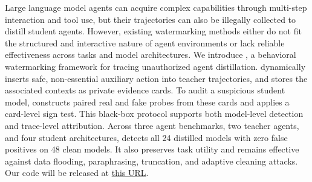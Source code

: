 Large language model agents can acquire complex capabilities through multi-step interaction and tool use, but their trajectories can also be illegally collected to distill student agents. However, existing watermarking methods either do not fit the structured and interactive nature of agent environments or lack reliable effectiveness across tasks and model architectures. We introduce \name{}, a behavioral watermarking framework for tracing unauthorized agent distillation. \name{} dynamically inserts safe, non-essential auxiliary action into teacher trajectories, and stores the associated contexts as private evidence cards. To audit a suspicious student model, \name{} constructs paired real and fake probes from these cards and applies a card-level sign test. This black-box protocol supports both model-level detection and trace-level attribution. Across three agent benchmarks, two teacher agents, and four student architectures, \name{} detects all 24 distilled models with zero false positives on 48 clean models. It also preserves task utility and remains effective against data flooding, paraphrasing, truncation, and adaptive cleaning attacks. Our code will be released at \href{https://github.com/qx041609/Auxmark}{this URL}.